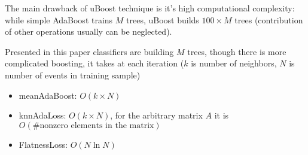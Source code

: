 The main drawback of uBoost technique is it's high computational complexity: 
while simple AdaBoost trains $M$ trees, uBoost builds $100 \times M$ trees (contribution of other operations usually can be neglected). 

Presented in this paper classifiers are building $M$ trees, though there is more complicated boosting, it takes at each iteration ($k$ is number of neighbors, $N$ is number of events in training sample)

\begin{itemize}
	\item meanAdaBoost: $O(k \times N)$
	\item knnAdaLoss: $O(k \times N)$, for the arbitrary matrix $A$ it is 
	$O( \text{\#nonzero elements in the matrix})$
	\item FlatnessLoss: $O(N \ln N)$
\end{itemize}
